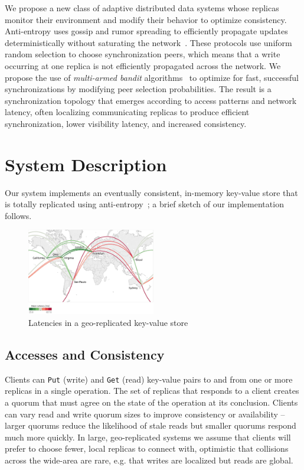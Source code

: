 We propose a new class of adaptive distributed data systems whose replicas
monitor their environment and modify their behavior to optimize consistency.
Anti-entropy uses gossip and rumor spreading to efficiently propagate updates
deterministically without saturating the
network~\cite{haeupler_simple_2015,karp_randomized_2000,moreno_dynamics_2004}.
These protocols use uniform random selection to choose synchronization peers,
which means that a write occurring at one replica is not efficiently
propagated across the network.
We propose the use of \textit{multi-armed bandit}
algorithms~\cite{langford_epoch-greedy_2008,luo_efficient_2017} to optimize
for fast, successful synchronizations by modifying peer selection
probabilities.
The result is a synchronization topology that emerges according to access
patterns and network latency, often localizing communicating replicas to
produce efficient synchronization, lower visibility latency, and increased
consistency.

\section*{System Description}

Our system implements an eventually consistent, in-memory key-value store
that is totally replicated using anti-entropy~\cite{decandia_dynamo:_2007};
a brief sketch of our implementation follows.

\begin{figure}[h]
    \centering
    \includegraphics[width=0.5\textwidth]{figures/network}
    \caption{Latencies in a geo-replicated key-value store}
    \label{fig:network}
\end{figure}

\subsection*{Accesses and Consistency}

Clients can \texttt{Put} (write) and \texttt{Get} (read) key-value pairs to
 and from one or more replicas in a single operation.
The set of replicas that responds to a client creates a quorum that must
agree on the state of the operation at its conclusion.
Clients can vary read and write quorum sizes to improve consistency or
availability -- larger quorums reduce the likelihood of stale reads but
smaller quorums respond much more quickly.
In large, geo-replicated systems we assume that clients will prefer to choose
fewer, local replicas to connect with, optimistic that collisions across the
wide-area are rare, e.g. that writes are localized but reads are global.

